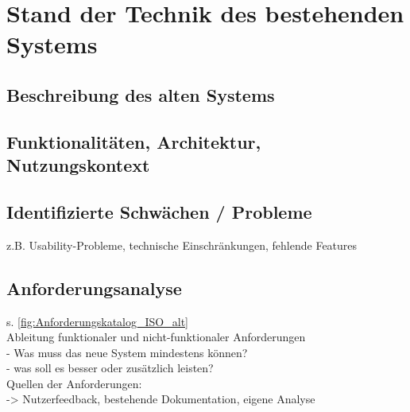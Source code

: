 \chapter{Stand der Technik des bestehenden Systems}
\label{ch:IST-Zustand}



\section{Beschreibung des alten Systems}
\section{Funktionalitäten, Architektur, Nutzungskontext}
\section{Identifizierte Schwächen / Probleme}
z.B. Usability-Probleme, technische Einschränkungen, fehlende Features

\section{Anforderungsanalyse}
s. \autoref{fig:Anforderungskatalog_ISO_alt}\\
Ableitung funktionaler und nicht-funktionaler Anforderungen\\
- Was muss das neue System mindestens können?\\
- was soll es besser oder zusätzlich leisten?\\
Quellen der Anforderungen:\\
-> Nutzerfeedback, bestehende Dokumentation, eigene Analyse\\

